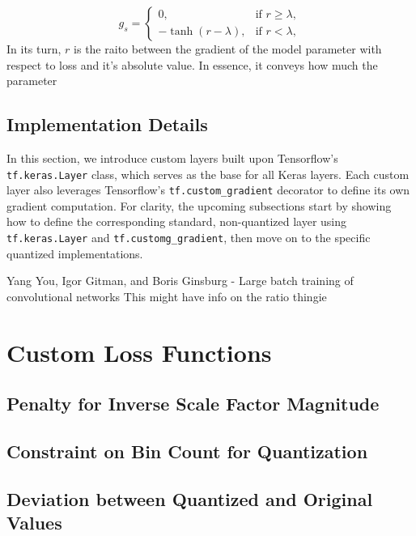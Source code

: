 \[
g_s = 
\begin{cases} 
0, & \text{if } r \geq \lambda, \\
-\tanh(r - \lambda), & \text{if } r < \lambda,
\end{cases}
\]
In its turn, \(  r  \) is the raito between the gradient of the model parameter with respect to loss and it's absolute value.
In essence, it conveys how much the parameter 




\subsection{Implementation Details}


\label{subsec:quantizedconvolutional}
In this section, we introduce custom layers built upon Tensorflow's \texttt{tf.keras.Layer} class, 
which serves as the base for all Keras layers. Each custom layer also leverages Tensorflow's 
\texttt{tf.custom\_gradient} decorator to define its own gradient computation.
For clarity, the upcoming subsections start by showing how to define the corresponding standard, 
non-quantized layer using \texttt{tf.keras.Layer} and \texttt{tf.customg\_gradient},
then move on to the specific quantized implementations.

Yang You, Igor Gitman, and Boris Ginsburg - Large batch training of convolutional networks
This might have info on the ratio thingie

\section{Custom Loss Functions}
\label{sec:customloss}

\subsection{Penalty for Inverse Scale Factor Magnitude} 
\label{subsec:scaleinverse}

\subsection{Constraint on Bin Count for Quantization}
\label{subsec:maxbin}

\subsection{Deviation between Quantized and Original Values}
\label{subsec:difference}